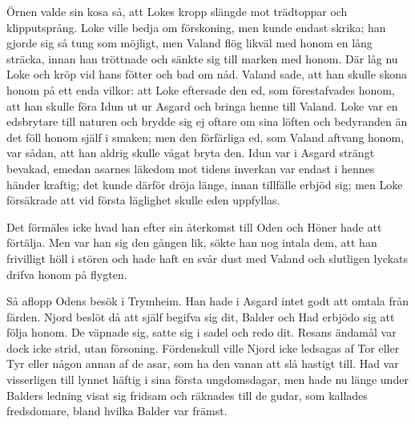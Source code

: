 Örnen valde sin kosa så, att Lokes kropp slängde mot trädtoppar och
klipputsprång. Loke ville bedja om förskoning, men kunde endast skrika;
han gjorde sig så tung som möjligt, men Valand flög likväl med honom en
lång sträcka, innan han tröttnade och sänkte sig till marken med honom.
Där låg nu Loke och kröp vid hans fötter och bad om nåd. Valand sade,
att han skulle skona honom på ett enda vilkor: att Loke eftersade den
ed, som förestafvades honom, att han skulle föra Idun ut ur Asgard och
bringa henne till Valand. Loke var en edsbrytare till naturen och brydde
sig ej oftare om sina löften och bedyranden än det föll honom själf i
smaken; men den förfärliga ed, som Valand aftvang honom, var sådan, att
han aldrig skulle vågat bryta den. Idun var i Asgard strängt bevakad,
emedan asarnes läkedom mot tidens inverkan var endast i hennes händer
kraftig; det kunde därför dröja länge, innan tillfälle erbjöd sig; men
Loke försäkrade att vid första läglighet skulle eden uppfyllas.

Det förmäles icke hvad han efter sin återkomst till Oden och Höner hade
att förtälja. Men var han sig den gången
\protect\hypertarget{lb1625905.xhtmlux5cux23start78}{}{}\protect\hypertarget{lb1625905.xhtmlux5cux23start78-a}{}{}\protect\hypertarget{lb1625905.xhtmlux5cux23start78-b}{}{}\protect\hypertarget{lb1625905.xhtmlux5cux23start78-c}{}{}\protect\hypertarget{lb1625905.xhtmlux5cux23start78-d}{}{}
lik, sökte han nog intala dem, att han frivilligt höll i stören och hade
haft en svår dust med Valand och slutligen lyckats drifva honom på
flygten.

Så aflopp Odens besök i Trymheim. Han hade i Asgard intet godt att
omtala från färden. Njord beslöt då att själf begifva sig dit, Balder
och Had erbjödo sig att följa honom. De väpnade sig, satte sig i sadel
och redo dit. Resans ändamål var dock icke strid, utan försoning.
Fördenskull ville Njord icke ledsagas af Tor eller Tyr eller någon annan
af de asar, som ha den vanan att slå hastigt till. Had var visserligen
till lynnet häftig i sina första ungdomsdagar, men hade nu länge under
Balders ledning visat sig fridsam och räknades till de gudar, som
kallades fredsdomare, bland hvilka Balder var främst.


